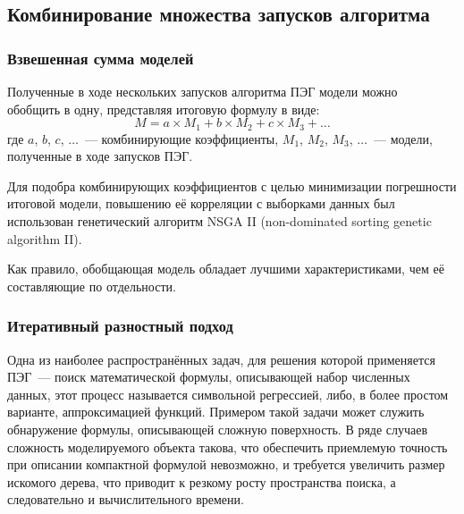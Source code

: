 






\subsection{Комбинирование множества запусков алгоритма}

\subsubsection{Взвешенная сумма моделей}

Полученные в ходе нескольких запусков алгоритма ПЭГ модели можно~\cite{journals/jikm/AbrahamG06, guo2012novel} обобщить в одну, представляя итоговую формулу в виде:
\begin{equation}
\label{eq:ensembles}
M = a \times M_1 + b \times M_2 + c \times M_3 + \ldots
\end{equation}
где $a$, $b$, $c$, $\ldots$~--- комбинирующие коэффициенты, $M_1$, $M_2$, $M_3$, $\ldots$~--- модели, полученные в ходе запусков ПЭГ.

Для подобра комбинирующих коэффициентов с целью минимизации погрешности итоговой модели, повышению её корреляции с выборками данных был использован генетический алгоритм NSGA II (non-dominated sorting genetic algorithm II).

Как правило, обобщающая модель обладает лучшими характеристиками, чем её составляющие по отдельности.


\subsubsection{Итеративный разностный подход}

Одна из наиболее распространённых задач, для решения которой применяется ПЭГ~--- поиск математической формулы, описывающей набор численных данных, этот процесс называется символьной регрессией, либо, в более простом варианте, аппроксимацией функций. Примером такой задачи может служить обнаружение формулы, описывающей сложную поверхность. В ряде случаев сложность моделируемого объекта такова, что обеспечить приемлемую точность при описании компактной формулой невозможно, и требуется увеличить размер искомого дерева, что приводит к резкому росту пространства поиска, а следовательно и вычислительного времени.

